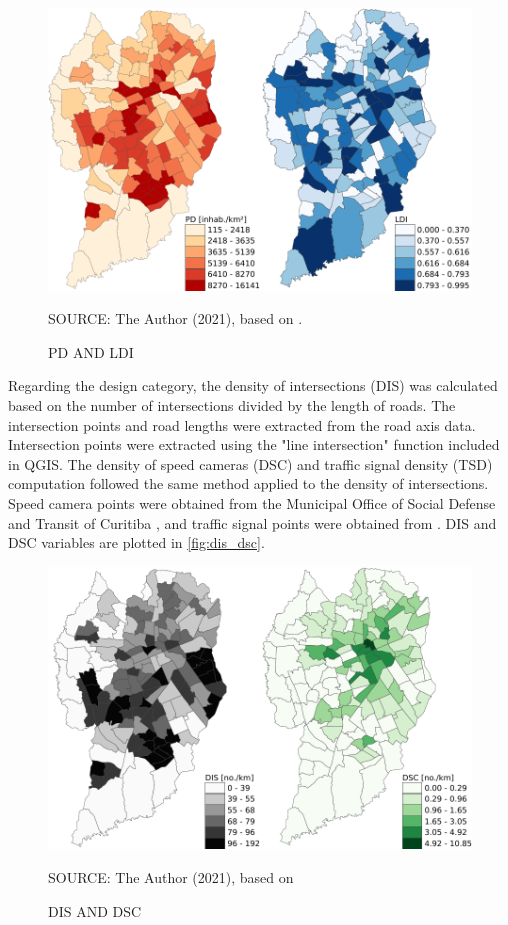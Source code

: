 \begin{figure}[!htbp]
    \centering\footnotesize
    \captionsetup{font=footnotesize}
    \caption{PD AND LDI}
    \includegraphics{fig/map_PD+LDI.pdf}
    \label{fig:pd_ldi}
    \par SOURCE: The Author (2021), based on \textcite{IBGE2010, IPPUC2018b, IPPUC2021}.
\end{figure}

Regarding the design category, the density of intersections (DIS) was calculated based on the number of intersections divided by the length of roads. The intersection points and road lengths were extracted from the \textcite{IPPUC2021} road axis data. Intersection points were extracted using the "line intersection" function included in QGIS. The density of speed cameras (DSC) and traffic signal density (TSD) computation followed the same method applied to the density of intersections. Speed camera points were obtained from the Municipal Office of Social Defense and Transit of Curitiba \cite{SETRAN2020}, and traffic signal points were obtained from \textcite{IPPUC2021}. DIS and DSC variables are plotted in \autoref{fig:dis_dsc}. 

\begin{figure}[!htbp]
    \centering\footnotesize
    \captionsetup{font=footnotesize}
    \caption{DIS AND DSC}
    \includegraphics{fig/map_DIS+DSC.pdf}
    \label{fig:dis_dsc}
    \par SOURCE: The Author (2021), based on \textcite{IPPUC2018b,IPPUC2021,SETRAN2020}
\end{figure}

